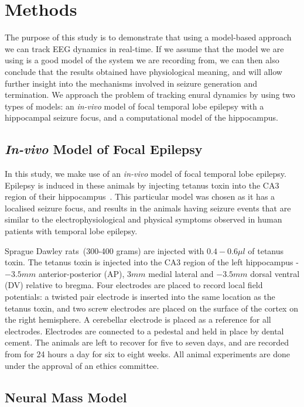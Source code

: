 \section{Methods}

The purpose of this study is to demonstrate that using a model-based approach we can track EEG dynamics in real-time. If we assume that the model we are using is a good model of the system we are recording from, we can then also conclude that the results obtained have physiological meaning, and will allow further insight into the mechanisms involved in seizure generation and termination. We approach the problem of tracking enural dynamics by using two types of models: an \textsl{in-vivo} model of focal temporal lobe epilepsy with a hippocampal seizure focus, and a computational model of the hippocampus.

\subsection{\textsl{In-vivo} Model of Focal Epilepsy}

In this study, we make use of an \textsl{in-vivo} model of focal temporal lobe epilepsy. Epilepsy is induced in these animals by injecting tetanus toxin into the CA3 region of their hippocampus~\citep{jefferys1995chronic}. This particular model was chosen as it has a localised seizure focus, and results in the animals having seizure events that are similar to the electrophysiological and physical symptoms observed in human patients with temporal lobe epilepsy. 

Sprague Dawley rats~(300-400 grams) are injected with $0.4-0.6\mu l$ of tetanus toxin. The tetanus toxin is injected into the CA3 region of the left hippocampus - $-3.5mm$ anterior-posterior (AP), $3mm$ medial lateral and $-3.5mm$ dorsal ventral (DV) relative to bregma. Four electrodes are placed to record local field potentials: a twisted pair electrode is inserted into the same location as the tetanus toxin, and two screw electrodes are placed on the surface of the cortex on the right hemisphere. A cerebellar electrode is placed as a reference for all electrodes. Electrodes are connected to a pedestal and held in place by dental cement. The animals are left to recover for five to seven days, and are recorded from for 24 hours a day for six to eight weeks. All animal experiments are done under the approval of an ethics committee.

\subsection{Neural Mass Model} 


